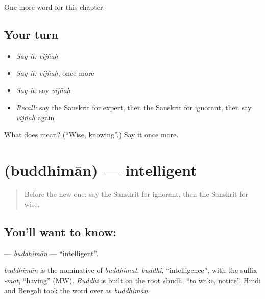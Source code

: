 \begin{grammarlens}[title={What you've built}]
One more word for this chapter.
\end{grammarlens}

\subsection*{Your turn}
\begin{itemize}
\raggedright
  \item \emph{Say it:} \emph{vijñaḥ}
  \item \emph{Say it:} \emph{vijñaḥ}, once more
  \item \emph{Say it:} say \emph{vijñaḥ}
  \item \emph{Recall:} say the Sanskrit for expert, then the Sanskrit for ignorant, then say \emph{vijñaḥ} again
\end{itemize}

\begin{tcolorbox}[breakable,colback=teal!4,colframe=teal!35!black,title={Before you move on}]
What does  mean? (\textquotedblleft{}Wise, knowing\textquotedblright{}.) Say it once more.
\end{tcolorbox}
\section[\texorpdfstring{\sk{बुद्धिमान्} (buddhimān)}{बुद्धिमान् (buddhimān)}]{ (buddhimān) — intelligent}

\label{lesson:SA-C216-buddhiman}



\begin{quote}
Before the new one: say the Sanskrit for ignorant, then the Sanskrit for wise.
\end{quote}

\subsection*{You'll want to know: }
\textbf{} — \emph{buddhimān} — \textquotedblleft{}intelligent\textquotedblright{}.

\begin{cousinweb}
\emph{buddhimān} is the nominative of \emph{buddhimat}, \emph{buddhi}, \textquotedblleft{}intelligence\textquotedblright{}, with the suffix \emph{-mat}, \textquotedblleft{}having\textquotedblright{} (MW). \emph{Buddhi} is built on the root √budh, \textquotedblleft{}to wake, notice\textquotedblright{}. Hindi and Bengali took the word over as \emph{buddhimān}.
\end{cousinweb}

